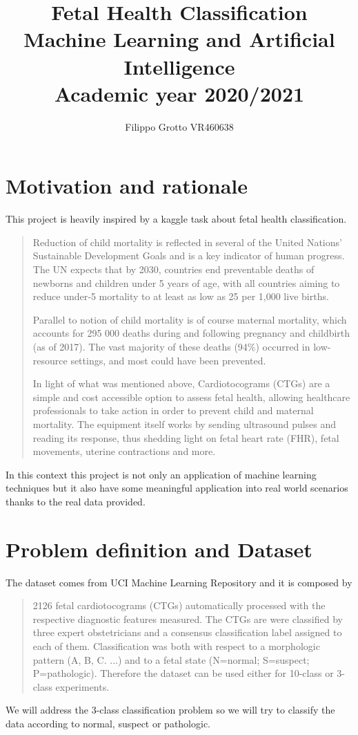 \documentclass[a4paper,12pt]{article}
\begin{document}
\author{Filippo Grotto VR460638}

\title{Fetal Health Classification  \\[1ex] \large Machine Learning and Artificial Intelligence \\[1ex] \large Academic year 2020/2021}

\maketitle
\tableofcontents
\newpage

\section{Motivation and rationale}
This project is heavily inspired by a kaggle task \cite{kaggle} about fetal health classification.
\begin{quote}
Reduction of child mortality is reflected in several of the United Nations' Sustainable Development Goals and is a key indicator of human progress.
The UN expects that by 2030, countries end preventable deaths of newborns and children under 5 years of age, with all countries aiming to reduce under‑5 mortality to at least as low as 25 per 1,000 live births.

Parallel to notion of child mortality is of course maternal mortality, which accounts for 295 000 deaths during and following pregnancy and childbirth (as of 2017). The vast majority of these deaths (94\%) occurred in low-resource settings, and most could have been prevented.

In light of what was mentioned above, Cardiotocograms (CTGs) are a simple and cost accessible option to assess fetal health, allowing healthcare professionals to take action in order to prevent child and maternal mortality. The equipment itself works by sending ultrasound pulses and reading its response, thus shedding light on fetal heart rate (FHR), fetal movements, uterine contractions and more.
\end{quote}
In this context this project is not only an application of machine learning techniques but it also have some meaningful application into real world scenarios thanks to the real data provided.


\section{Problem definition and Dataset}
The dataset comes from UCI Machine Learning Repository \cite{uci} and it is composed by 
\begin{quote}
2126 fetal cardiotocograms (CTGs) automatically processed with the respective diagnostic features measured. The CTGs are were classified by three expert obstetricians and a consensus classification label assigned to each of them. Classification was both with respect to a morphologic pattern (A, B, C. ...) and to a fetal state (N=normal; S=suspect; P=pathologic). Therefore the dataset can be used either for 10-class or 3-class experiments.
\end{quote}
We will address the 3-class classification problem so we will try to classify the data according to normal, suspect or pathologic.
\end{document}
